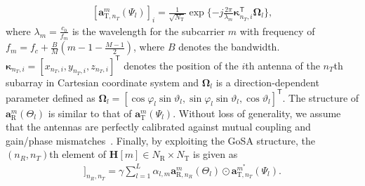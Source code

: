 \documentclass[journal,10pt]{IEEEtran}
\begin{document}
{		\begin{align}
		\label{svector}
		[\mathbf{a}_{\mathrm{T},n_T}^m(\Psi_{l})]_i =   \frac{1}{\sqrt{N_\mathrm{T}}}\exp \{-j\frac{2\pi }{\lambda_m} \boldsymbol{\kappa}_{n_T,i}^\textsf{T} \boldsymbol{\Omega}_{l}   \},
		\end{align}
		where $\lambda_m = \frac{c_0}{f_m}$ is the wavelength for the subcarrier $m$ with frequency of $f_m = f_c + \frac{B}{M}(m - 1 - \frac{M-1}{2})$, where $B$ denotes the bandwidth.  $\boldsymbol{\kappa}_{n_T,i} = [x_{n_T,i},y_{n_T,i},z_{n_T,i}]^\textsf{T}$ denotes the position of the $i$th antenna of the $n_T$th subarray in Cartesian coordinate system and $\boldsymbol{\Omega}_{l}$ is a direction-dependent parameter defined as $	\boldsymbol{\Omega}_{l} =  [\cos\varphi_{l}\sin\vartheta_{l}, \sin\varphi_{l}\sin\vartheta_{l}, \cos\vartheta_{l}]^\textsf{T}.$
		The structure of  $\mathbf{a}_\mathrm{R}^m(\Theta_{l})$  is similar to that of $\mathbf{a}_\mathrm{T}^m(\Psi_{l})$.  Without loss of generality, we assume that the antennas are perfectly calibrated against mutual coupling and gain/phase mismatches~\cite{ummimoTareq}. 
		Finally, by exploiting the GoSA structure, the $(n_R,n_T)$th element of $\mathbf{H}[m]\in N_\mathrm{R}\times N_\mathrm{T}$ is given as
		\begin{align}
		[\mathbf{H}[m]]_{n_R,n_T} = \gamma \sum_{l = 1}^{L} \alpha_{l,m}   \mathbf{a}_{\mathrm{R},n_R}^m(\Theta_{l})\odot \mathbf{a}_{\mathrm{T},n_T}^{m^*}(\Psi_{l}).
		\end{align}
		
	}
	
\end{document}
